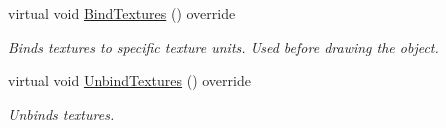 \begin{DoxyCompactItemize}
virtual void \mbox{\hyperlink{class_geometry_engine_1_1_geometry_material_1_1_alpha_normal_map_texture_material_a49dd763e0d239fed2ddaf389de36a692}{Bind\+Textures}} () override
\begin{DoxyCompactList}\small\item\em Binds textures to specific texture units. Used before drawing the object. \end{DoxyCompactList}\item 
\mbox{\label{class_geometry_engine_1_1_geometry_material_1_1_alpha_normal_map_texture_material_a9be3fea2b6e584b92934ffc396c6be8f}} 
virtual void \mbox{\hyperlink{class_geometry_engine_1_1_geometry_material_1_1_alpha_normal_map_texture_material_a9be3fea2b6e584b92934ffc396c6be8f}{Unbind\+Textures}} () override
\begin{DoxyCompactList}\small\item\em Unbinds textures. \end{DoxyCompactList}\end{DoxyCompactItemize}
